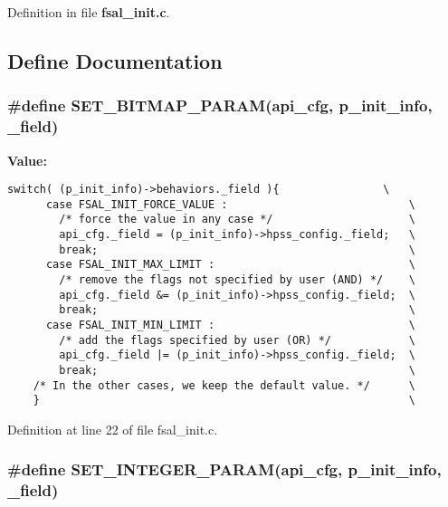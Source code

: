 Definition in file {\bf fsal\_\-init.c}.

\subsection{Define Documentation}
\subsubsection[{SET\_\-BITMAP\_\-PARAM}]{\setlength{\rightskip}{0pt plus 5cm}\#define SET\_\-BITMAP\_\-PARAM(api\_\-cfg, \/  p\_\-init\_\-info, \/  \_\-field)}\label{fsal__init_8c_d4acf7e55a5ad7300edb9d27c5865001}


\textbf{Value:}

\begin{Code}\begin{verbatim}switch( (p_init_info)->behaviors._field ){                \
      case FSAL_INIT_FORCE_VALUE :                            \
        /* force the value in any case */                     \
        api_cfg._field = (p_init_info)->hpss_config._field;   \
        break;                                                \
      case FSAL_INIT_MAX_LIMIT :                              \
        /* remove the flags not specified by user (AND) */    \
        api_cfg._field &= (p_init_info)->hpss_config._field;  \
        break;                                                \
      case FSAL_INIT_MIN_LIMIT :                              \
        /* add the flags specified by user (OR) */            \
        api_cfg._field |= (p_init_info)->hpss_config._field;  \
        break;                                                \
    /* In the other cases, we keep the default value. */      \
    }                                                         \
\end{verbatim}
\end{Code}


Definition at line 22 of file fsal\_\-init.c.
\subsubsection[{SET\_\-INTEGER\_\-PARAM}]{\setlength{\rightskip}{0pt plus 5cm}\#define SET\_\-INTEGER\_\-PARAM(api\_\-cfg, \/  p\_\-init\_\-info, \/  \_\-field)}\label{fsal__init_8c_802153fcb81fd9f7b272dbf6eb477aec}


